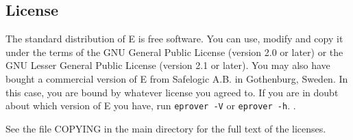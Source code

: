 \documentclass{article}
\begin{document}
\clearpage
\begin{appendix}
  \section{License}
  
  The standard distribution of E is free software. You can use, modify
  and copy it under the terms of the GNU General Public License
  (version 2.0 or later) or the GNU Lesser General Public License
  (version 2.1 or later). You may also have bought a commercial
  version of E from Safelogic A.B. in Gothenburg, Sweden. In this
  case, you are bound by whatever license you agreed to. If you are in
  doubt about which version of E you have, run \texttt{eprover -V} or
  \texttt{eprover -h}.
.

  See the file COPYING in the main directory for the full text of the
  licenses. 
\end{appendix}
\end{document}
